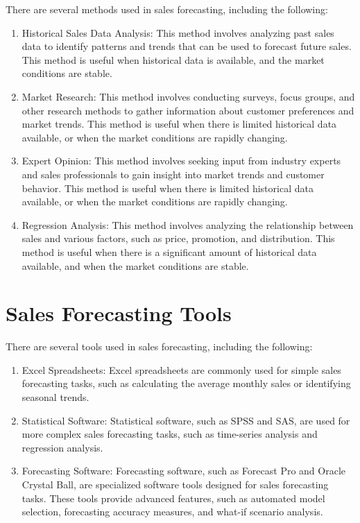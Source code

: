 There are several methods used in sales forecasting, including the following:
	\begin{enumerate}
		\item Historical Sales Data Analysis: This method involves analyzing past sales data to identify patterns and trends that can be used to forecast future sales. This method is useful when historical data is available, and the market conditions are stable.
		\item Market Research: This method involves conducting surveys, focus groups, and other research methods to gather information about customer preferences and market trends. This method is useful when there is limited historical data available, or when the market conditions are rapidly changing.
		\item Expert Opinion: This method involves seeking input from industry experts and sales professionals to gain insight into market trends and customer behavior. This method is useful when there is limited historical data available, or when the market conditions are rapidly changing.
		\item Regression Analysis: This method involves analyzing the relationship between sales and various factors, such as price, promotion, and distribution. This method is useful when there is a significant amount of historical data available, and when the market conditions are stable.
	\end{enumerate}

\section{Sales Forecasting Tools}

There are several tools used in sales forecasting, including the following:
	\begin{enumerate}
		\item Excel Spreadsheets: Excel spreadsheets are commonly used for simple sales forecasting tasks, such as calculating the average monthly sales or identifying seasonal trends.
		\item Statistical Software: Statistical software, such as SPSS and SAS, are used for more complex sales forecasting tasks, such as time-series analysis and regression analysis.
		\item Forecasting Software: Forecasting software, such as Forecast Pro and Oracle Crystal Ball, are specialized software tools designed for sales forecasting tasks. These tools provide advanced features, such as automated model selection, forecasting accuracy measures, and what-if scenario analysis.
	\end{enumerate}

